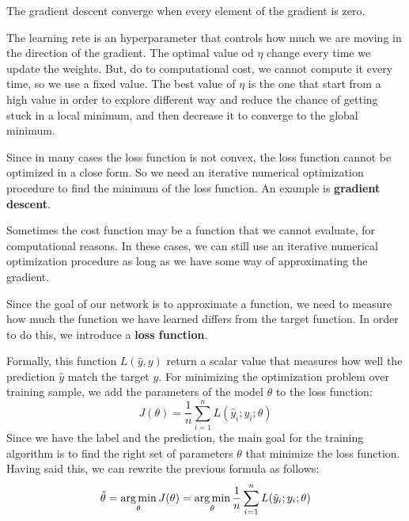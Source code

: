 \begin{note}
    The gradient descent converge when every element of the gradient is zero.
\end{note}

The learning rete is an hyperparameter that controls how much we are moving in the
direction of the gradient. The optimal value od $\eta$ change every time we update
the weights. But, do to computational cost, we cannot compute it every time, so we
use a fixed value. The best value of $\eta$ is the one that start from a high value
in order to explore different way and reduce the chance of getting stuck in a local
minimum, and then decrease it to converge to the global minimum.

Since in many cases the loss function is not convex, the loss function cannot be
optimized in a close form. So we need an iterative numerical optimization
procedure to find the minimum of the loss function. An example is \textbf{gradient
    descent}.

Sometimes the cost function may be a function that we cannot evaluate, for
computational reasons. In these cases, we can still use an iterative numerical
optimization procedure as long as we have some way of approximating the gradient.

Since the goal of our network is to approximate a function, we need to measure how
much the function we have learned differs from the target function. In order to
do this, we introduce a \textbf{loss function}.

Formally, this function $L(\hat{y}, y)$ return a scalar value that measures how
well the prediction $\hat{y}$ match the target $y$. For minimizing the optimization
problem over training sample, we add the parameters of the model $\theta$ to the
loss function:
\begin{equation}
    J(\theta) = \frac{1}{n} \sum_{i=1}^n L(\hat{y}_i; y_i; \theta)
\end{equation}
Since we have the label and the prediction, the main goal for the training algorithm
is to find the right set of parameters $\theta$ that minimize the loss function.
Having said this, we can rewrite the previous formula as follows:
\begin{equation}
    \hat{\theta} = \operatorname*{arg\,min}_{\theta} J(\theta) = \operatorname*{arg\,min}_{\theta} \frac{1}{n}
    \sum_{i=1}^n L(\hat{y}_i; y_i; \theta)
\end{equation}

